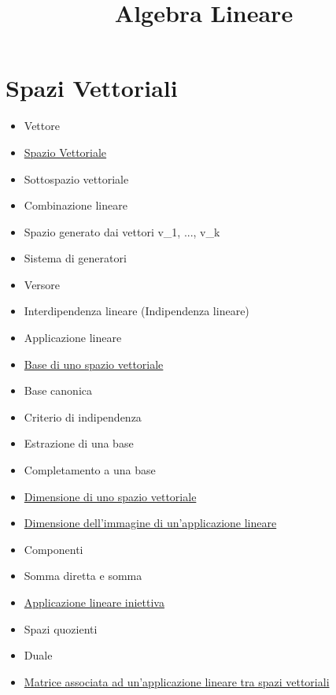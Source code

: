 \documentclass[a4paper,10pt]{article}
\title{Algebra Lineare}
\begin{document}
\maketitle

\section{Spazi Vettoriali}
\begin{itemize}
 \item Vettore
 \item \href{SpazioVettoriale.html}{Spazio Vettoriale}
 \item Sottospazio vettoriale
 \item Combinazione lineare
 \item Spazio generato dai vettori v_1, ..., v_k
 \item Sistema di generatori
 \item Versore
 \item Interdipendenza lineare (Indipendenza lineare)
 \item Applicazione lineare
 \item \href{Base.html}{Base di uno spazio vettoriale}
 \item Base canonica
 \item Criterio di indipendenza
 \item Estrazione di una base
 \item Completamento a una base
 \item \href{Dimensione.html}{Dimensione di uno spazio vettoriale}
 \item \href{DimensioneImmagine.html}{Dimensione dell'immagine di un'applicazione lineare}
 \item Componenti
 \item Somma diretta e somma 
 \item \href{ApplicazioneIniettiva.html}{Applicazione lineare iniettiva} 
 \item Spazi quozienti
 \item Duale
 \item \href{MatriceApplicazione.html}{Matrice associata ad un'applicazione lineare tra spazi vettoriali}
\end{itemize}
\end{document}
